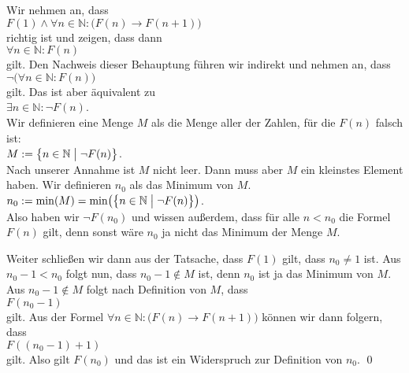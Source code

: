 \proof
Wir nehmen an, dass
\\[0.2cm]
\hspace*{1.3cm}
$F(1) \wedge \forall n \in \mathbb{N}:\bigl(F(n) \rightarrow F(n+1)\bigr)$
\\[0.2cm]
richtig ist und zeigen, dass dann
\\[0.2cm]
\hspace*{1.3cm}
$\forall n \in \mathbb{N}:F(n)$
\\[0.2cm]
gilt.  Den Nachweis dieser Behauptung führen wir indirekt und nehmen an, dass
\\[0.2cm]
\hspace*{1.3cm}
$\neg\bigl(\forall n \in \mathbb{N}:F(n)\bigr)$
\\[0.2cm]
gilt.  Das ist aber äquivalent zu
\\[0.2cm]
\hspace*{1.3cm}
$\exists n \in \mathbb{N}:\neg F(n)$.
\\[0.2cm]
Wir definieren eine Menge $M$ als die Menge aller der Zahlen, für die $F(n)$ falsch ist:
\\[0.2cm]
\hspace*{1.3cm}
$M := \bigl\{ n \in \mathbb{N} \bigm| \neg F(n) \bigr\}$.
\\[0.2cm]
Nach unserer Annahme ist $M$ nicht leer.  Dann muss aber $M$ ein kleinstes Element haben.  Wir definieren
$n_0$ als das Minimum von $M$.
\\[0.2cm]
\hspace*{1.3cm}
$n_0 := \min( M) = \min\bigl(\bigl\{ n \in \mathbb{N} \bigm| \neg F(n) \bigr\}\bigr)$.
\\[0.2cm]
Also haben wir $\neg F(n_0)$ und wissen außerdem, dass für alle $n < n_0$ die Formel $F(n)$ gilt, denn
sonst wäre $n_0$ ja nicht das Minimum der Menge $M$.

Weiter schließen wir dann aus der Tatsache, dass $F(1)$ gilt, dass $n_0 \not= 1$ ist.  
Aus $n_0 -1 < n_0$ folgt nun, dass $n_0-1 \not\in M$ ist, denn $n_0$ ist ja das Minimum von $M$.
Aus  $n_0-1 \not\in M$ folgt nach Definition von $M$, dass
\\[0.2cm]
\hspace*{1.3cm}
$F(n_0 - 1)$
\\[0.2cm]
gilt.  Aus der Formel $\forall n \in \mathbb{N}:\bigl( F(n) \rightarrow F(n+1)\bigr)$ können wir dann folgern, dass
\\[0.2cm]
\hspace*{1.3cm}
$F((n_0-1) +1)$
\\[0.2cm] 
gilt.  Also gilt $F(n_0)$ und das ist ein Widerspruch zur Definition von $n_0$. \qed

